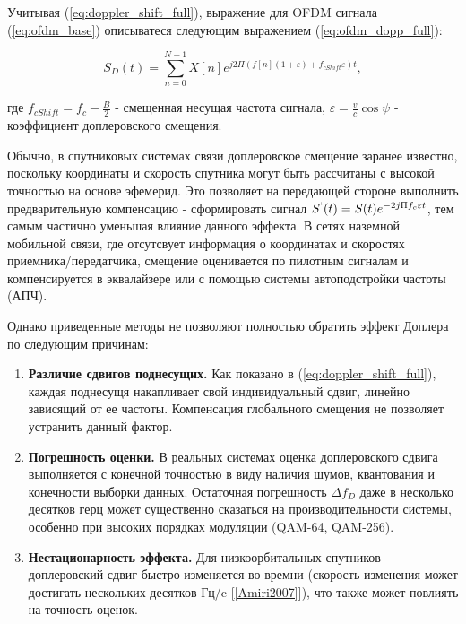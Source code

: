 Учитывая (\ref{eq:doppler_shift_full}), выражение для OFDM сигнала (\ref{eq:ofdm_base})
описыватеся следующим выражением (\ref{eq:ofdm_dopp_full}):

\begin{equation}
    S_D(t) = \sum_{n = 0}^{N - 1} X[n] e^{j 2 \Pi (f[n](1 + \varepsilon ) + f_{cShift}\varepsilon) t},
    \label{eq:ofdm_dopp_full}
\end{equation}

\noindent где $f_{cShift} = f_c - \frac{B}{2}$ - смещенная несущая частота сигнала, $\varepsilon = \frac{v}{c} \cos \psi$ - коэффициент доплеровского смещения.

Обычно, в спутниковых системах связи доплеровское смещение заранее известно, поскольку координаты
 и скорость спутника могут быть рассчитаны с высокой точностью на основе эфемерид. Это позволяет на передающей
 стороне выполнить предварительную компенсацию - сформировать сигнал $S^`(t) = S(t) e^{- 2 j \Pi f_{c} \varepsilon t}$,
 тем самым частично уменьшая влияние данного эффекта.
В сетях наземной мобильной связи, где отсутсвует информация о координатах и скоростях приемника/передатчика,
смещение оценивается по пилотным сигналам и компенсируется в эквалайзере или с помощью системы автоподстройки частоты (АПЧ).

Однако приведенные методы не позволяют полностью обратить эффект Доплера по следующим причинам:

\begin{enumerate}
    \item \textbf{Различие сдвигов поднесущих.} Как показано в (\ref{eq:doppler_shift_full}), каждая
    поднесущя накапливает свой индивидуальный сдвиг, линейно зависящий от ее частоты. Компенсация глобального
    смещения не позволяет устранить данный фактор.
    \item \textbf{Погрешность оценки.} В реальных системах оценка доплеровского сдвига выполняется с конечной
    точностью в виду наличия шумов, квантования и конечности выборки данных. Остаточная погрешность $\Delta f_D$
    даже в несколько десятков герц может существенно сказаться на производительности системы, особенно при высоких
    порядках модуляции (QAM-64, QAM-256).

    \item \textbf{Нестационарность эффекта.} Для низкоорбитальных спутников доплеровский сдвиг быстро изменяется
    во времни (скорость изменения может достигать нескольких десятков Гц/c [\ref{Amiri2007}]), что также может повлиять
    на точность оценок.
\end{enumerate}

